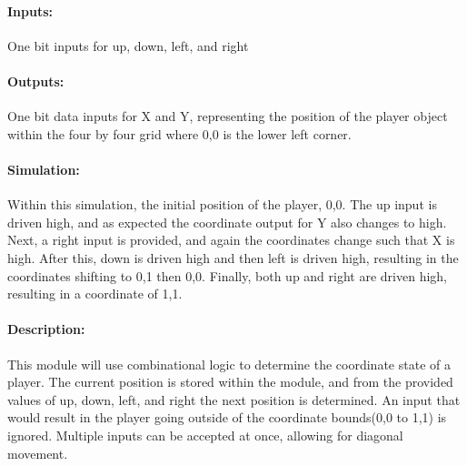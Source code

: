 \documentclass[]{article}
\begin{document}
\paragraph{Inputs:} One bit inputs for up, down, left, and right
\paragraph{Outputs:} One bit data inputs for X and Y, representing the position of the player object within the four by four grid where 0,0 is the lower left corner.
\paragraph{Simulation:} Within this simulation, the initial position of the player, 0,0. The up input is driven high, and as expected the coordinate output for Y also changes to high. Next, a right input is provided, and again the coordinates change such that X is high. After this, down is driven high and then left is driven high, resulting in the coordinates shifting to 0,1 then 0,0. Finally, both up and right are driven high, resulting in a coordinate of 1,1.
\paragraph{Description:} This module will use combinational logic to determine the coordinate state of a player. The current position is stored within the module, and from the provided values of up, down, left, and right the next position is determined. An input that would result in the player going outside of the coordinate bounds(0,0 to 1,1) is ignored. Multiple inputs can be accepted at once, allowing for diagonal movement.
\end{document}
